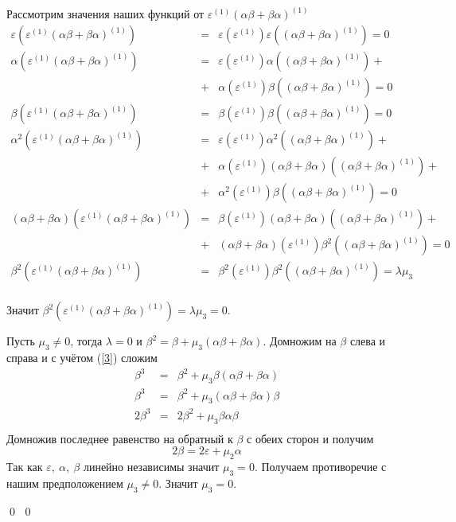 \documentclass[12pt, reqno, a4paper, oneside, notitlepage]{amsart}
\makeatletter
\theoremstyle{mytheoremstyle}
\theoremstyle{myremarkstyle}
\numberwithin{equation}{section}
\renewenvironment{proof}[1][\proofname]{\par\indent {\bfseries #1\@addpunct{.} }}{\qed}
\makeatother
\begin{document}
\begin{proof}
\begin{proof}
    Рассмотрим значения наших функций от $\varepsilon^{(1)}(\alpha\beta+\beta\alpha)^{(1)}$
    \begin{eqnarray*}
    \varepsilon\left(\varepsilon^{(1)}(\alpha\beta+\beta\alpha)^{(1)}\right) &=& 
    \varepsilon\left(\varepsilon^{(1)}\right)\varepsilon\left((\alpha\beta+\beta\alpha)^{(1)}\right) = 0\\
    \alpha\left(\varepsilon^{(1)}(\alpha\beta+\beta\alpha)^{(1)}\right) &=&
    \varepsilon\left(\varepsilon^{(1)}\right)\alpha\left((\alpha\beta+\beta\alpha)^{(1)}\right)+\\
    &+&\alpha\left(\varepsilon^{(1)}\right)\beta\left((\alpha\beta+\beta\alpha)^{(1)}\right) = 0\\
    \beta\left(\varepsilon^{(1)}(\alpha\beta+\beta\alpha)^{(1)}\right) &=&
    \beta\left(\varepsilon^{(1)}\right)\beta\left((\alpha\beta+\beta\alpha)^{(1)}\right) = 0\\
    \alpha^2\left(\varepsilon^{(1)}(\alpha\beta+\beta\alpha)^{(1)}\right) &=&
    \varepsilon\left(\varepsilon^{(1)}\right)\alpha^2\left((\alpha\beta+\beta\alpha)^{(1)}\right)+\\
    &+&
    \alpha\left(\varepsilon^{(1)}\right)(\alpha\beta+\beta\alpha)\left((\alpha\beta+\beta\alpha)^{(1)}\right)+\\
    &+& \alpha^2\left(\varepsilon^{(1)}\right)\beta\left((\alpha\beta+\beta\alpha)^{(1)}\right) = 0\\
    (\alpha\beta+\beta\alpha)\left(\varepsilon^{(1)}(\alpha\beta+\beta\alpha)^{(1)}\right) &=&
    \beta\left(\varepsilon^{(1)}\right)(\alpha\beta+\beta\alpha)\left((\alpha\beta+\beta\alpha)^{(1)}\right)+\\
    &+&(\alpha\beta+\beta\alpha)\left(\varepsilon^{(1)}\right)\beta^2\left((\alpha\beta+\beta\alpha)^{(1)}\right) = 0\\
    \beta^2\left(\varepsilon^{(1)}(\alpha\beta+\beta\alpha)^{(1)}\right) &=& \beta^2\left(\varepsilon^{(1)}\right)\beta^2\left((\alpha\beta+\beta\alpha)^{(1)}\right) = \lambda\mu_3\\
    \end{eqnarray*}

    Значит $\beta^2\left(\varepsilon^{(1)}(\alpha\beta+\beta\alpha)^{(1)}\right) = \lambda\mu_3 = 0$.

    Пусть $\mu_3 \neq 0$, тогда $\lambda = 0$ и $\beta^2 = \beta + \mu_3(\alpha\beta+\beta\alpha)$.
    Домножим на $\beta$ слева и справа и с учётом (\ref{3}) сложим 
    \begin{eqnarray*}
        \beta^3 &=& \beta^2 + \mu_3 \beta(\alpha\beta+\beta\alpha)\\
        \beta^3 &=& \beta^2 + \mu_3 (\alpha\beta+\beta\alpha)\beta\\
        2\beta^3 &=& 2\beta^2 + \mu_3 \beta\alpha\beta\\
    \end{eqnarray*}
    Домножив последнее равенство на обратный к $\beta$ с обеих сторон и получим
    \[
    2\beta = 2\varepsilon+\mu_2\alpha
    \]
    Так как $\varepsilon,\ \alpha,\ \beta$ линейно независимы значит $\mu_3 = 0$. Получаем противоречие с нашим предположением $\mu_3 \neq 0$. Значит $\mu_3 = 0$.


\end{proof}
\end{proof}
\end{document}
